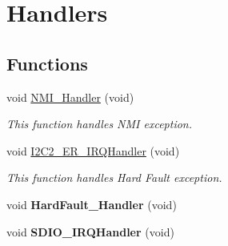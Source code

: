 \hypertarget{group___interrupt}{
\section{Handlers}
\label{group___interrupt}
}
\subsection*{Functions}
\begin{DoxyCompactItemize}
\item 
void \hyperlink{group___interrupt_ga6ad7a5e3ee69cb6db6a6b9111ba898bc}{NMI\_\-Handler} (void)
\begin{DoxyCompactList}\small\item\em This function handles NMI exception. \end{DoxyCompactList}\item 
void \hyperlink{group___interrupt_gaecd40b8012604ac4236bda3f65857c37}{I2C2\_\-ER\_\-IRQHandler} (void)
\begin{DoxyCompactList}\small\item\em This function handles Hard Fault exception. \end{DoxyCompactList}\item 
\hypertarget{group___interrupt_ga2bffc10d5bd4106753b7c30e86903bea}{
void {\bfseries HardFault\_\-Handler} (void)}
\label{group___interrupt_ga2bffc10d5bd4106753b7c30e86903bea}

\item 
\hypertarget{group___interrupt_gadb3e01a3e924c7c52cad43949a43e9c7}{
void {\bfseries SDIO\_\-IRQHandler} (void)}
\label{group___interrupt_gadb3e01a3e924c7c52cad43949a43e9c7}


\end{DoxyCompactItemize}
